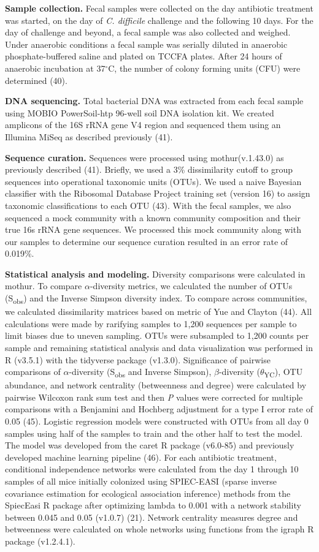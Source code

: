 \documentclass[11pt,]{article}
\begin{document}
\textbf{Sample collection.} Fecal samples were collected on the day
antibiotic treatment was started, on the day of \emph{C. difficile}
challenge and the following 10 days. For the day of challenge and
beyond, a fecal sample was also collected and weighed. Under anaerobic
conditions a fecal sample was serially diluted in anaerobic
phosphate-buffered saline and plated on TCCFA plates. After 24 hours of
anaerobic incubation at 37\(^\circ\)C, the number of colony forming
units (CFU) were determined (40).

\textbf{DNA sequencing.} Total bacterial DNA was extracted from each
fecal sample using MOBIO PowerSoil-htp 96-well soil DNA isolation kit.
We created amplicons of the 16S rRNA gene V4 region and sequenced them
using an Illumina MiSeq as described previously (41).

\textbf{Sequence curation.} Sequences were processed using
mothur(v.1.43.0) as previously described (41). Briefly, we used a 3\%
dissimilarity cutoff to group sequences into operational taxonomic units
(OTUs). We used a naive Bayesian classifier with the Ribosomal Database
Project training set (version 16) to assign taxonomic classifications to
each OTU (43). With the fecal samples, we also sequenced a mock
community with a known community composition and their true 16s rRNA
gene sequences. We processed this mock community along with our samples
to determine our sequence curation resulted in an error rate of 0.019\%.

\textbf{Statistical analysis and modeling.} Diversity comparisons were
calculated in mothur. To compare \(\alpha\)-diversity metrics, we
calculated the number of OTUs (S\textsubscript{obs}) and the Inverse
Simpson diversity index. To compare across communities, we calculated
dissimilarity matrices based on metric of Yue and Clayton (44). All
calculations were made by rarifying samples to 1,200 sequences per
sample to limit biases due to uneven sampling. OTUs were subsampled to
1,200 counts per sample and remaining statistical analysis and data
visualization was performed in R (v3.5.1) with the tidyverse package
(v1.3.0). Significance of pairwise comparisons of \(\alpha\)-diversity
(S\textsubscript{obs} and Inverse Simpson), \(\beta\)-diversity
(\(\theta\)\textsubscript{YC}), OTU abundance, and network centrality
(betweenness and degree) were calculated by pairwise Wilcoxon rank sum
test and then \emph{P} values were corrected for multiple comparisons
with a Benjamini and Hochberg adjustment for a type I error rate of 0.05
(45). Logistic regression models were constructed with OTUs from all day
0 samples using half of the samples to train and the other half to test
the model. The model was developed from the caret R package (v6.0-85)
and previously developed machine learning pipeline (46). For each
antibiotic treatment, conditional independence networks were calculated
from the day 1 through 10 samples of all mice initially colonized using
SPIEC-EASI (sparse inverse covariance estimation for ecological
association inference) methods from the SpiecEasi R package after
optimizing lambda to 0.001 with a network stability between 0.045 and
0.05 (v1.0.7) (21). Network centrality measures degree and betweenness
were calculated on whole networks using functions from the igraph R
package (v1.2.4.1).
\end{document}
